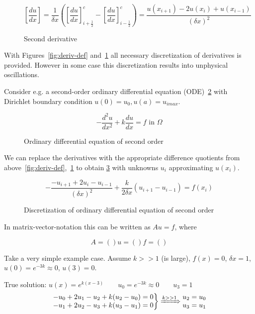 \documentclass[a4paper,11pt]{scrartcl}
\begin{document}
\begin{figure}[H]
	\centering
	\[ \left[\frac{d u}{d x}\right] = \frac{1}{\delta x}\left(\left[\frac{d u}{d x}\right]^c_{i+\frac{1}{2}} - \left[\frac{d u}{d x}\right]^c_{i-\frac{1}{2}}\right) = \frac{u(x_{i+1}) - 2u(x_i) + u(x_{i-1})}{(\delta x)^2}  \]
    \renewcommand{\thefigure}{3.5}
	\caption{Second derivative}
	\label{fig:deriv-def2}
\end{figure}


With Figures~\ref{fig:deriv-def} and~\ref{fig:deriv-def2} all necessary discretization of derivatives is provided. However in some case this discretization results into unphysical oscillations.

Consider e.g. a second-order ordinary differential equation (ODE)~\ref{fig:ode} with Dirichlet boundary condition $u(0) = u_0, u(a) = u_{imax}$.
\begin{figure}[H]
	\centering
	\[ -\frac{d^2 u }{dx^2} + k \frac{du}{dx} = f \text{ in } \Omega \]
	\renewcommand{\thefigure}{3.6}
	\caption{Ordinary differential equation of second order}
	\label{fig:ode}
\end{figure}

We can replace the derivatives with the appropriate difference quotients from above~\ref{fig:deriv-def},~\ref{fig:deriv-def2} to obtain \ref{fig:disc-ode} with unknowns $u_i$ approximating $u(x_i)$.

\begin{figure}[H]
	\centering
	\[ -\frac{-u_{i+1} + 2u_i - u_{i-1}}{(\delta x)^2} + \frac{k}{2 \delta x} (u_{i+1} -u_{i-1}) = f(x_i)\]
	\renewcommand{\thefigure}{3.7}
	\caption{Discretization of ordinary differential equation of second order}
	\label{fig:disc-ode}
\end{figure}

In matrix-vector-notation this can be written as $Au = f$, where 

\[
A = ()  u = ()   f = ()
\]

Take a very simple example case. Assume $k >> 1$ (is large), $f(x) = 0$, $\delta x = 1$, $u(0) = e^{-3k} \approx 0$, $u(3) = 0$.

True solution: $u(x) = e^{k(x-3)} \qquad u_0 = e^{-3k} \approx 0 \qquad u_3 = 1$
\[\left.\begin{matrix}
	-u_0 + 2u_1 -u_2  + k(u_2 -u_0) =0\\
	-u_1 + 2u_2 - u_3 + k(u_3-u_1) = 0
	\end{matrix}\right\rbrace \xRightarrow{k >> 1}\begin{matrix}
	u_2 = u_0\\
	u_3 = u_1
	\end{matrix} \]
\end{document}
